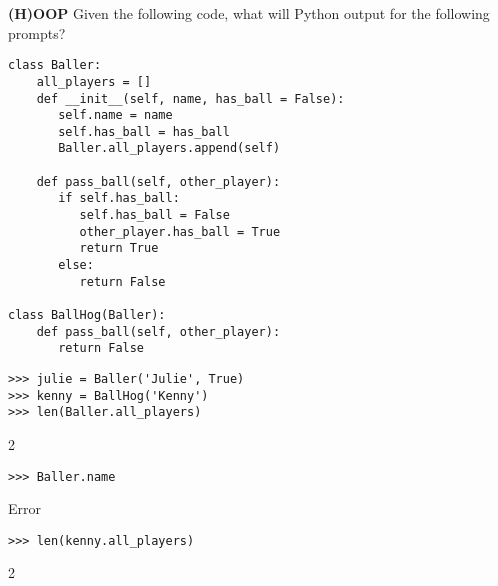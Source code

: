 \begin{blocksection}
\question \textbf{(H)OOP} \newline
Given the following code, what will Python output for the following prompts?

\begin{lstlisting}
class Baller:
    all_players = []
    def __init__(self, name, has_ball = False):
       self.name = name
       self.has_ball = has_ball
       Baller.all_players.append(self)

    def pass_ball(self, other_player):
       if self.has_ball:
          self.has_ball = False
          other_player.has_ball = True
          return True
       else:
          return False

class BallHog(Baller):
    def pass_ball(self, other_player):
       return False

\end{lstlisting}
\end{blocksection}
\newline
\newline
\newline
\begin{blocksection}

\begin{lstlisting}
>>> julie = Baller('Julie', True)
>>> kenny = BallHog('Kenny')
>>> len(Baller.all_players)
\end{lstlisting}
\begin{solution}[.2in]
2
\end{solution}

\begin{lstlisting}
>>> Baller.name
\end{lstlisting}
\begin{solution}[.2in]
Error
\end{solution}

\begin{lstlisting}
>>> len(kenny.all_players)
\end{lstlisting}
\begin{solution}[.2in]
2
\end{solution}
\end{blocksection}

